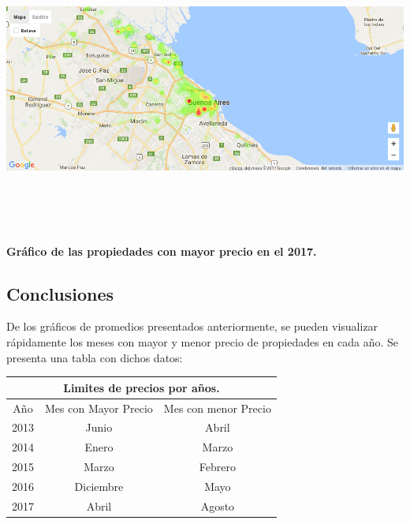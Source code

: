 \documentclass[a4paper, 10pt]{article}
\newcommand\tab[1][0.5cm]{\hspace*{#1}}
\begin{document}
        \begin{center}
              \includegraphics[width=7in, height=4in]{images/ubicP2017}
              \textbf{Gráfico de las propiedades con mayor precio en el 2017.}
        \end{center}


      \subsection{Conclusiones}

        \tab De los gráficos de promedios presentados anteriormente, se pueden visualizar rápidamente  los meses con mayor y menor precio de propiedades en cada año. Se presenta una tabla con dichos datos:

        \begin{center}
          \begin{tabular}{ |c|c|c| }
            \hline
            \multicolumn{3}{|c|}{Limites de precios por años.}\\
            \hline
            \hline
            Año & Mes con Mayor Precio & Mes con menor Precio \\
            \hline
            2013 & Junio & Abril \\
            2014 & Enero & Marzo \\
            2015 & Marzo & Febrero \\
            2016 & Diciembre & Mayo \\
            2017 & Abril & Agosto \\
            \hline
          \end{tabular}
        \end{center}
\end{document}
